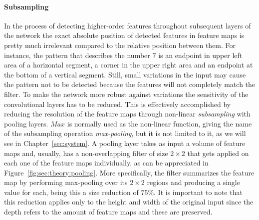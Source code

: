 \paragraph{Subsampling}
In the process of detecting higher-order features throughout subsequent layers of the network the exact absolute position of detected features in feature maps is pretty much irrelevant compared to the relative position between them.
For instance, the pattern that describes the number $7$ is an endpoint in upper left area of a horizontal segment, a corner in the upper right area and an endpoint at the bottom of a vertical segment.
Still, small variations in the input may cause the pattern not to be detected because the features will not completely match the filter.
To make the network more robust against variations the sensitivity of the convolutional layers has to be reduced.
This is effectively accomplished by reducing the resolution of the feature maps through non-linear \emph{subsampling} with pooling layers.
$Max$ is normally used as the non-linear function, giving the name of the subsampling operation \emph{max-pooling}, but it is not limited to it, as we will see in Chapter~\ref{sec:system}.
A pooling layer takes as input a volume of feature maps and, usually, has a non-overlapping filter of size ${2}\times{2}$ that gets applied on each one of the feature maps individually, as can be appreciated in Figure~\ref{fig:sec:theory:pooling}.
More specifically, the filter summarizes the feature map by performing max-pooling over its ${2}\times{2}$ regions and producing a single value for each, being this a size reduction of $75\%$.
It is important to note that this reduction applies only to the height and width of the original input since the depth refers to the amount of feature maps and these are preserved.

